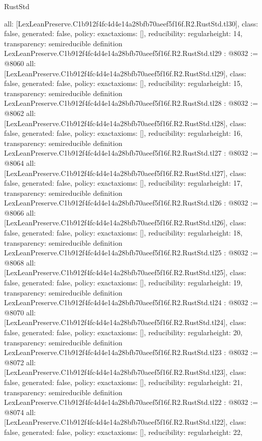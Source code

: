 \begin{lexlean}{RustStd}
\begin{coremodule}
{  all: [LexLeanPreserve.C1b912f4fc4d4e14a28bfb70aeef5f16f.R2.RustStd.tl30],
  class: false,
  generated: false,
  policy: exact{axioms: []},
  reducibility: regular{height: 14},
  transparency: semireducible
}
definition LexLeanPreserve.C1b912f4fc4d4e14a28bfb70aeef5f16f.R2.RustStd.tl29 : @8032 := @8060 {
  all: [LexLeanPreserve.C1b912f4fc4d4e14a28bfb70aeef5f16f.R2.RustStd.tl29],
  class: false,
  generated: false,
  policy: exact{axioms: []},
  reducibility: regular{height: 15},
  transparency: semireducible
}
definition LexLeanPreserve.C1b912f4fc4d4e14a28bfb70aeef5f16f.R2.RustStd.tl28 : @8032 := @8062 {
  all: [LexLeanPreserve.C1b912f4fc4d4e14a28bfb70aeef5f16f.R2.RustStd.tl28],
  class: false,
  generated: false,
  policy: exact{axioms: []},
  reducibility: regular{height: 16},
  transparency: semireducible
}
definition LexLeanPreserve.C1b912f4fc4d4e14a28bfb70aeef5f16f.R2.RustStd.tl27 : @8032 := @8064 {
  all: [LexLeanPreserve.C1b912f4fc4d4e14a28bfb70aeef5f16f.R2.RustStd.tl27],
  class: false,
  generated: false,
  policy: exact{axioms: []},
  reducibility: regular{height: 17},
  transparency: semireducible
}
definition LexLeanPreserve.C1b912f4fc4d4e14a28bfb70aeef5f16f.R2.RustStd.tl26 : @8032 := @8066 {
  all: [LexLeanPreserve.C1b912f4fc4d4e14a28bfb70aeef5f16f.R2.RustStd.tl26],
  class: false,
  generated: false,
  policy: exact{axioms: []},
  reducibility: regular{height: 18},
  transparency: semireducible
}
definition LexLeanPreserve.C1b912f4fc4d4e14a28bfb70aeef5f16f.R2.RustStd.tl25 : @8032 := @8068 {
  all: [LexLeanPreserve.C1b912f4fc4d4e14a28bfb70aeef5f16f.R2.RustStd.tl25],
  class: false,
  generated: false,
  policy: exact{axioms: []},
  reducibility: regular{height: 19},
  transparency: semireducible
}
definition LexLeanPreserve.C1b912f4fc4d4e14a28bfb70aeef5f16f.R2.RustStd.tl24 : @8032 := @8070 {
  all: [LexLeanPreserve.C1b912f4fc4d4e14a28bfb70aeef5f16f.R2.RustStd.tl24],
  class: false,
  generated: false,
  policy: exact{axioms: []},
  reducibility: regular{height: 20},
  transparency: semireducible
}
definition LexLeanPreserve.C1b912f4fc4d4e14a28bfb70aeef5f16f.R2.RustStd.tl23 : @8032 := @8072 {
  all: [LexLeanPreserve.C1b912f4fc4d4e14a28bfb70aeef5f16f.R2.RustStd.tl23],
  class: false,
  generated: false,
  policy: exact{axioms: []},
  reducibility: regular{height: 21},
  transparency: semireducible
}
definition LexLeanPreserve.C1b912f4fc4d4e14a28bfb70aeef5f16f.R2.RustStd.tl22 : @8032 := @8074 {
  all: [LexLeanPreserve.C1b912f4fc4d4e14a28bfb70aeef5f16f.R2.RustStd.tl22],
  class: false,
  generated: false,
  policy: exact{axioms: []},
  reducibility: regular{height: 22},
}
\end{coremodule}
\end{lexlean}
